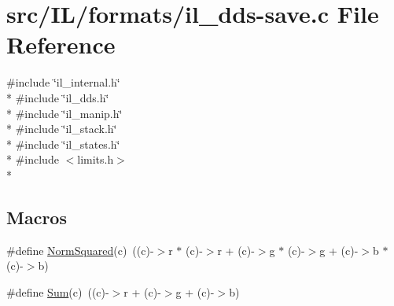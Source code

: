 \hypertarget{il__dds-save_8c}{\section{src/\-I\-L/formats/il\-\_\-dds-\/save.c File Reference}
\label{il__dds-save_8c}
}
{\ttfamily \#include \char`\"{}il\-\_\-internal.\-h\char`\"{}}\\*
{\ttfamily \#include \char`\"{}il\-\_\-dds.\-h\char`\"{}}\\*
{\ttfamily \#include \char`\"{}il\-\_\-manip.\-h\char`\"{}}\\*
{\ttfamily \#include \char`\"{}il\-\_\-stack.\-h\char`\"{}}\\*
{\ttfamily \#include \char`\"{}il\-\_\-states.\-h\char`\"{}}\\*
{\ttfamily \#include $<$limits.\-h$>$}\\*
\subsection*{Macros}
\begin{DoxyCompactItemize}
\item 
\#define \hyperlink{il__dds-save_8c_aa1b1acefaf88bd7832af3f82ff5c2ab6}{Norm\-Squared}(c)~((c)-\/$>$r $\ast$ (c)-\/$>$r + (c)-\/$>$g $\ast$ (c)-\/$>$g + (c)-\/$>$b $\ast$ (c)-\/$>$b)
\item 
\#define \hyperlink{il__dds-save_8c_a17e5153307d5f35fee89d0461b945bf5}{Sum}(c)~((c)-\/$>$r + (c)-\/$>$g + (c)-\/$>$b)
\end{DoxyCompactItemize}
